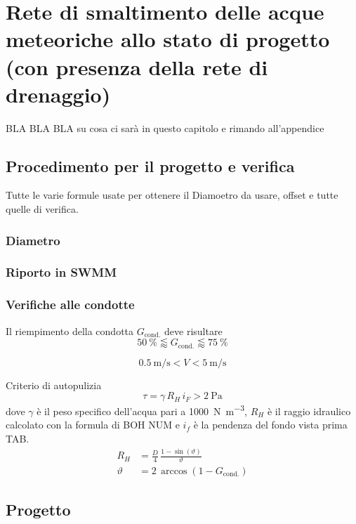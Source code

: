 \chapter{Rete di smaltimento delle acque meteoriche allo stato di progetto (con presenza
della rete di drenaggio)}
BLA BLA BLA su cosa ci sarà in questo capitolo e rimando all'appendice
\section{Procedimento per il progetto e verifica}
Tutte le varie formule usate per ottenere il Diamoetro da usare, offset e tutte quelle di verifica.
\subsection{Diametro}
\subsection{Riporto in SWMM}
\subsection{Verifiche alle condotte}
Il riempimento della condotta $G_\text{cond.}$ deve risultare 
\begin{equation}
    \SI{50}{\percent} \lessapprox G_\text{cond.} \lessapprox\SI{75}{\percent}
\end{equation}


\begin{equation}
    \SI{0.5}{\metre\per\second} < V <  \SI{5}{\metre\per\second}
\end{equation}

Criterio di autopulizia
\begin{equation}
    \tau = \gamma \, R_H \, i_F > \SI{2}{\pascal}
\end{equation}
dove $\gamma$ è il peso specifico dell'acqua pari a \SI{1000}{\newton\per\metre\cubed}, $R_H$ è il raggio idraulico calcolato con la formula di BOH NUM e $i_f$ è la pendenza del fondo vista prima TAB.  
\begin{align}
    R_H &= \frac{D}{4} \, \frac{1 - \sin(\vartheta)}{\vartheta} \\
    \vartheta &= 2 \, \arccos(1 - G_\text{cond.})
\end{align}






\section{Progetto}
